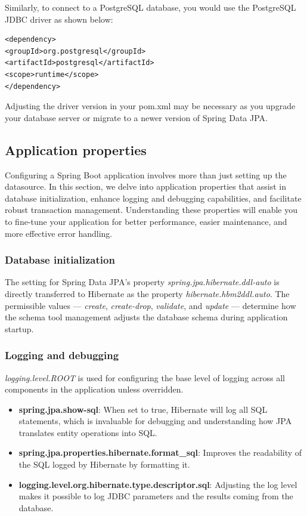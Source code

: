 Similarly,  to connect to a PostgreSQL database, you would use the PostgreSQL JDBC driver as shown below:

\begin{lstlisting}
<dependency>
<groupId>org.postgresql</groupId>
<artifactId>postgresql</artifactId>
<scope>runtime</scope>
</dependency>
\end{lstlisting}

Adjusting the driver version in your pom.xml may be necessary as you upgrade your database server or migrate to a newer version of Spring Data JPA.

\subsection{Application properties}

Configuring a Spring Boot application involves more than just setting up the datasource. In this section, we delve into application properties that assist in database initialization, enhance logging and debugging capabilities, and facilitate robust transaction management. Understanding these properties will enable you to fine-tune your application for better performance, easier maintenance, and more effective error handling.

\subsubsection{Database initialization}

The setting for Spring Data JPA's property \textit{spring.jpa.hibernate.ddl-auto} is directly transferred to Hibernate as the property \textit{hibernate.hbm2ddl.auto}. The permissible values — \textit{create}, \textit{create-drop}, \textit{validate}, and \textit{update} — determine how the schema tool management adjusts the database schema during application startup.


\subsubsection{Logging and debugging}

\textit{logging.level.ROOT} is used for configuring the base level of logging across all components in the application unless overridden.

\begin{itemize}
\item \textbf{spring.jpa.show-sql}: When set to true, Hibernate will log all SQL statements, which is invaluable for debugging and understanding how JPA translates entity operations into SQL.

\item \textbf{spring.jpa.properties.hibernate.format\_sql}: Improves the readability of the SQL logged by Hibernate by formatting it.

\item \textbf{logging.level.org.hibernate.type.descriptor.sql}: Adjusting the log level makes it possible to log JDBC parameters and the results coming from the database.
\end{itemize}



